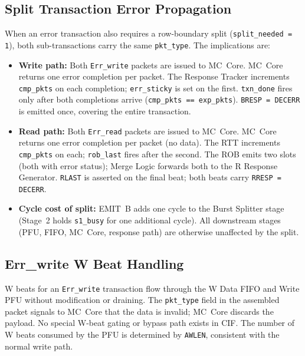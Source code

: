 \subsection{Split Transaction Error Propagation}

When an error transaction also requires a row-boundary split
(\texttt{split\_needed = 1}), both sub-transactions carry the same
\texttt{pkt\_type}. The implications are:

\begin{itemize}
  \item \textbf{Write path:} Both \texttt{Err\_write} packets are issued to
        MC~Core. MC~Core returns one error completion per packet. The Response
        Tracker increments \texttt{cmp\_pkts} on each completion; \texttt{err\_sticky}
        is set on the first. \texttt{txn\_done} fires only after both
        completions arrive (\texttt{cmp\_pkts == exp\_pkts}).
        \texttt{BRESP = DECERR} is emitted once, covering the entire
        transaction.
  \item \textbf{Read path:} Both \texttt{Err\_read} packets are issued to
        MC~Core. MC~Core returns one error completion per packet (no data).
        The RTT increments \texttt{cmp\_pkts} on each; \texttt{rob\_last}
        fires after the second. The ROB emits two slots (both with error
        status); Merge Logic forwards both to the R Response Generator.
        \texttt{RLAST} is asserted on the final beat; both beats carry
        \texttt{RRESP = DECERR}.
  \item \textbf{Cycle cost of split:} EMIT~B adds one cycle to the Burst
        Splitter stage (Stage~2 holds \texttt{s1\_busy} for one additional
        cycle). All downstream stages (PFU, FIFO, MC~Core, response path) are
        otherwise unaffected by the split.
\end{itemize}

\subsection{Err\_write W Beat Handling}

W beats for an \texttt{Err\_write} transaction flow through the W Data FIFO
and Write PFU without modification or draining. The \texttt{pkt\_type} field in
the assembled packet signals to MC~Core that the data is invalid; MC~Core
discards the payload. No special W-beat gating or bypass path exists in CIF.
The number of W beats consumed by the PFU is determined by \texttt{AWLEN},
consistent with the normal write path.

